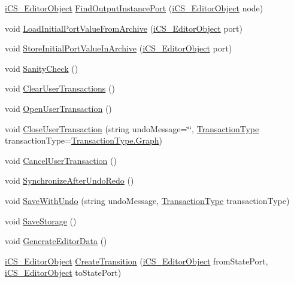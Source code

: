 \begin{DoxyCompactItemize}
\item 
\hyperlink{classi_c_s___editor_object}{i\+C\+S\+\_\+\+Editor\+Object} \hyperlink{classi_c_s___i_storage_a8d10f1b134b7ba54bf8a9e6d18600dc5}{Find\+Output\+Instance\+Port} (\hyperlink{classi_c_s___editor_object}{i\+C\+S\+\_\+\+Editor\+Object} node)
\item 
void \hyperlink{classi_c_s___i_storage_a05637380cb67c2b83f850b638438ed71}{Load\+Initial\+Port\+Value\+From\+Archive} (\hyperlink{classi_c_s___editor_object}{i\+C\+S\+\_\+\+Editor\+Object} port)
\item 
void \hyperlink{classi_c_s___i_storage_ae089b43b03ff96a18fd76a50b11ea43c}{Store\+Initial\+Port\+Value\+In\+Archive} (\hyperlink{classi_c_s___editor_object}{i\+C\+S\+\_\+\+Editor\+Object} port)
\item 
void \hyperlink{classi_c_s___i_storage_add0d2e01db5b0fb49d8c8cb0a8011b5d}{Sanity\+Check} ()
\item 
void \hyperlink{classi_c_s___i_storage_a8f911aacd2a5ba5f3602457bf4c59d5d}{Clear\+User\+Transactions} ()
\item 
void \hyperlink{classi_c_s___i_storage_af21c8c98af00a1c4edda4da56c245887}{Open\+User\+Transaction} ()
\item 
void \hyperlink{classi_c_s___i_storage_a440240bbdfe312816b24583280133b6d}{Close\+User\+Transaction} (string undo\+Message=\char`\"{}\char`\"{}, \hyperlink{i_c_s___i_storage___storage_mgmt_8cs_aa7a2e64697569804f14626bbb2649a58}{Transaction\+Type} transaction\+Type=\hyperlink{i_c_s___i_storage___storage_mgmt_8cs_aa7a2e64697569804f14626bbb2649a58a4cdbd2bafa8193091ba09509cedf94fd}{Transaction\+Type.\+Graph})
\item 
void \hyperlink{classi_c_s___i_storage_a46ec476e23956009e385c7860f29b77a}{Cancel\+User\+Transaction} ()
\item 
void \hyperlink{classi_c_s___i_storage_a0d03803a502c27c85b77665438528adb}{Synchronize\+After\+Undo\+Redo} ()
\item 
void \hyperlink{classi_c_s___i_storage_a0313c7bd4f69fe8b3722a934070ceba6}{Save\+With\+Undo} (string undo\+Message, \hyperlink{i_c_s___i_storage___storage_mgmt_8cs_aa7a2e64697569804f14626bbb2649a58}{Transaction\+Type} transaction\+Type)
\item 
void \hyperlink{classi_c_s___i_storage_a4817bfe5711f6aba15939df35e0b5ef4}{Save\+Storage} ()
\item 
void \hyperlink{classi_c_s___i_storage_a228ea6d301cc8805f5d2bdf4b36c9626}{Generate\+Editor\+Data} ()
\item 
\hyperlink{classi_c_s___editor_object}{i\+C\+S\+\_\+\+Editor\+Object} \hyperlink{classi_c_s___i_storage_a2fee6fe2a7681b8fcc316f008d1bf1e5}{Create\+Transition} (\hyperlink{classi_c_s___editor_object}{i\+C\+S\+\_\+\+Editor\+Object} from\+State\+Port, \hyperlink{classi_c_s___editor_object}{i\+C\+S\+\_\+\+Editor\+Object} to\+State\+Port)

\end{DoxyCompactItemize}
